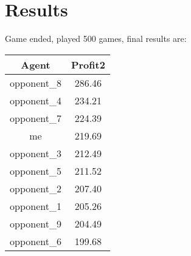 \documentclass[12pt,letterpaper]{article}
\begin{document}
\section*{Results}

Game ended, played 500 games, final results are: 

\begin{center}
\begin{tabular}{||c | c||} 
 \hline
 Agent & Profit2 \\ [0.5ex] 
 \hline\hline
 opponent\_8 &  286.46\\ 
 \hline
    opponent\_4 	&  234.21 \\
 \hline
 opponent\_7 &  224.39  \\
 \hline
  me 	&  219.69 	\\
 \hline
  opponent\_3 	&  212.49 \\ 
\hline
opponent\_5 	&   211.52 \\
\hline
opponent\_2 	&   207.40 \\
\hline
 opponent\_1 	&   205.26 \\
\hline
opponent\_9 	&   204.49 \\
\hline 
opponent\_6 	 &  199.68 \\ [1ex] 
 \hline
\end{tabular}
\end{center}
\end{document}
